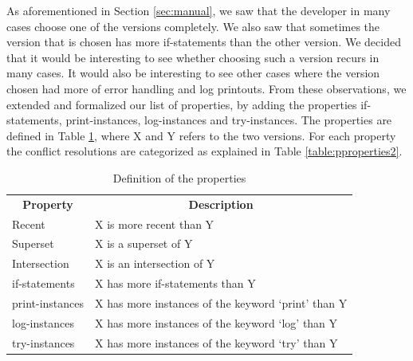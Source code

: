 As aforementioned in Section \ref{sec:manual}, we saw that the developer in many cases choose one of the versions completely. We also saw that sometimes the version that is chosen has more if-statements than the other version. We decided that it would be interesting to see whether choosing such a version recurs in many cases. It would also be interesting to see other cases where the version chosen had more of error handling and log printouts. From these observations, we extended and formalized our list of properties, by adding the properties if-statements, print-instances, log-instances and try-instances. The properties are defined in Table \ref{table:propdef}, where X and Y refers to the two versions. For each property the conflict resolutions are categorized as explained in Table \ref{table:pproperties2}.

\FloatBarrier
\begin{table}
\caption{Definition of the properties}\label{table:propdef}
\begin{tabular}{ l l }
\hline
\multicolumn{1}{c}{\textbf{Property}} & \multicolumn{1}{c}{\textbf{Description}}\\
Recent & X is more recent than Y\\
Superset & X is a superset of Y\\
Intersection & X is an intersection of Y\\
if-statements & X has more if-statements than Y\\
print-instances & X has more instances of the keyword ‘print’ than Y\\
log-instances & X has more instances of the keyword ‘log’ than Y\\
try-instances & X has more instances of the keyword ‘try’ than Y\\
\end{tabular}
\end{table}
\FloatBarrier


